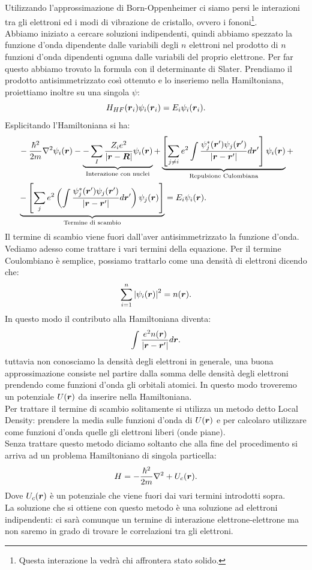 Utilizzando l'approssimazione di Born-Oppenheimer ci siamo persi le interazioni tra gli elettroni ed i modi di vibrazione de cristallo, ovvero i fononi\footnote{Questa interazione la vedrà chi affrontera stato solido.}.\\
Abbiamo iniziato a cercare soluzioni indipendenti, quindi abbiamo spezzato la funzione d'onda dipendente dalle variabili degli $n$ elettroni nel prodotto di $n$ funzioni d'onda dipendenti ognuna dalle variabili del proprio elettrone. Per far questo abbiamo trovato la formula con il determinante di Slater.
Prendiamo il prodotto antisimmetrizzato così ottenuto e lo inseriemo nella Hamiltoniana, proiettiamo inoltre su una singola $\psi$: 
\[
	H_{HF}(\boldsymbol{r}_i)\psi_i(\boldsymbol{r}_i) 
	=
	E_i \psi_i(\boldsymbol{r}_i)
.\] 
Esplicitando l'Hamiltoniana si ha:
\[\begin{aligned}
	&-\frac{\hbar^2}{2m}\nabla^2\psi_i(\bs{r}) -
%
	\underbrace{-\sum_{I}^{} 
		\frac{Z_i e^2}{\left| \bs{r}-\bs{R} \right| }
		\psi_i (\bs{r})}_
		{\text{Interazione con nuclei}} +
%
	\underbrace{
		\left[ \sum_{j\neq i}^{} 
		e^2\int
		\frac{\psi_j^*(\bs{r}')\psi_j(\bs{r}')}{\left| \bs{r}-\bs{r}' \right| }
		d \bs{r}' \right] \psi_i(\bs{r})}_
		{\text{Repulsione Culombiana}}+\\
%
	&\underbrace{
		-\left[ \sum_{j}^{} e^2\left( \int \frac{\psi_j^*(\bs{r}')
		\psi_j(\bs{r}')}{\left| \bs{r}-\bs{r}'\right|}d\bs{r}'\right)
		\psi_j(\bs{r})\right]}_
		{\text{Termine di scambio}} =
	E_i \psi_i(\bs{r})
.\end{aligned}\]
Il termine di scambio viene fuori dall'aver antisimmetrizzato la funzione d'onda.\\
Vediamo adesso come trattare i vari termini della equazione. Per il termine Coulombiano è semplice, possiamo trattarlo come una densità di elettroni dicendo che:
\[
	\sum_{i=1}^{n} \left| \psi_i(\boldsymbol{r}) \right| ^2=n(\boldsymbol{r})
.\] 
In questo modo il contributo alla Hamiltoniana diventa:
\[
	\int\frac{e^2n(\boldsymbol{r})}{\left| \boldsymbol{r}-\boldsymbol{r}' \right| }d \boldsymbol{r}
.\] 
tuttavia non conosciamo la densità degli elettroni in generale, una buona approssimazione consiste nel partire dalla somma delle densità degli elettroni prendendo come funzioni d'onda gli orbitali atomici. In questo modo troveremo un potenziale $U(\boldsymbol{r})$ da inserire nella Hamiltoniana. \\
Per trattare il termine di scambio solitamente si utilizza un metodo detto Local Density: prendere la media sulle funzioni d'onda di $U(\boldsymbol{r})$ e per calcolaro utilizzare come funzioni d'onda quelle gli elettroni liberi (onde piane).\\
Senza trattare questo metodo diciamo soltanto che alla fine del procedimento si arriva ad un problema Hamiltoniano di singola particella:
\[
	H = -\frac{\hbar ^2}{2m}\nabla^2 + U_c(\boldsymbol{r})
.\] 
Dove $U_c(\boldsymbol{r})$ è un potenziale che viene fuori dai vari termini introdotti sopra.\\
La soluzione che si ottiene con questo metodo è una soluzione ad elettroni indipendenti: ci sarà comunque un termine di interazione elettrone-elettrone ma non saremo in grado di trovare le correlazioni tra gli elettroni.
